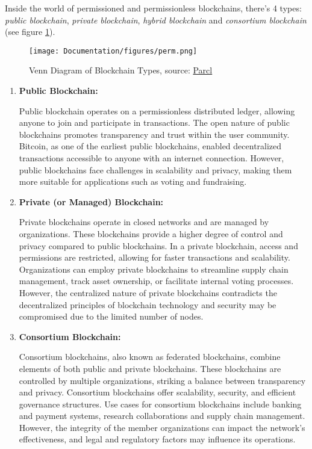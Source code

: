 Inside the world of permissioned and permissionless blockchains, there's 4 types: \textit{public blockchain}, \textit{private blockchain}, \textit{hybrid blockchain} and \textit{consortium blockchain} (see figure \ref{fig:type})\cite{bc_types}.

\begin{figure}[htbp]
	\centering
	\texttt{[image: Documentation/figures/perm.png]}  %
	\caption{Venn Diagram of Blockchain Types, source: \href{https://www.parcl.co/blog/the-4-types-of-blockchain-and-why-you-should-know-the-difference}{Parcl}}
	\label{fig:type}
\end{figure}

\begin{enumerate}
    \item \textbf{Public Blockchain:}

    Public blockchain operates on a permissionless distributed ledger, allowing anyone to join and participate in transactions. The open nature of public blockchains promotes transparency and trust within the user community. Bitcoin, as one of the earliest public blockchains, enabled decentralized transactions accessible to anyone with an internet connection. However, public blockchains face challenges in scalability and privacy, making them more suitable for applications such as voting and fundraising.
    
    \item \textbf{Private (or Managed) Blockchain:}

    Private blockchains operate in closed networks and are managed by organizations. These blockchains provide a higher degree of control and privacy compared to public blockchains. In a private blockchain, access and permissions are restricted, allowing for faster transactions and scalability. Organizations can employ private blockchains to streamline supply chain management, track asset ownership, or facilitate internal voting processes. However, the centralized nature of private blockchains contradicts the decentralized principles of blockchain technology and security may be compromised due to the limited number of nodes.
    
    \item \textbf{Consortium Blockchain:}

    Consortium blockchains, also known as federated blockchains, combine elements of both public and private blockchains. These blockchains are controlled by multiple organizations, striking a balance between transparency and privacy. Consortium blockchains offer scalability, security, and efficient governance structures. Use cases for consortium blockchains include banking and payment systems, research collaborations and supply chain management. However, the integrity of the member organizations can impact the network's effectiveness, and legal and regulatory factors may influence its operations.
    

\end{enumerate}
